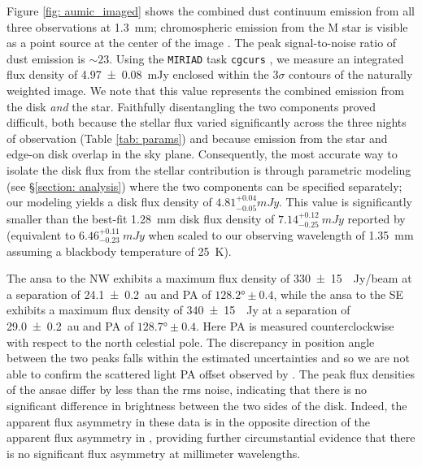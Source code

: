 \documentclass[modern]{aastex62}
\begin{document}
Figure \ref{fig: aumic_imaged} shows the combined dust continuum emission from all three observations at \SI{1.3}{mm}; chromospheric emission from the M star is visible as a point source at the center of the image \citep{cranmer13}. 
The peak signal-to-noise ratio of dust emission is $\sim 23$.
Using the \texttt{MIRIAD} task \texttt{cgcurs} \citep{sault95}, we measure an integrated flux density of \SI{4.97 \pm 0.08}{\milli Jy} enclosed within the $3\sigma$ contours of the naturally weighted image.  
We note that this value represents the combined emission from the disk \textit{and} the star. 
Faithfully disentangling the two components proved difficult, both because the stellar flux varied significantly across the three nights of observation (Table \ref{tab: params}) and because emission from the star and edge-on disk overlap in the sky plane.
Consequently, the most accurate way to isolate the disk flux from the stellar contribution is through parametric modeling (see \S \ref{section: analysis}) where the two components can be specified separately; our modeling yields a disk flux density of $4.81 ^{+0.04} _{-0.05} \si{mJy}$.
This value is significantly smaller than the best-fit \SI{1.28}{mm} disk flux density of $7.14^{+0.12}_{-0.25}~\si{mJy}$ reported by \cite{macgregor13} (equivalent to $6.46^{+0.11}_{-0.23}~\si{mJy}$ when scaled to our observing wavelength of \SI{1.35}{mm} assuming a blackbody temperature of \SI{25}{K}).

The ansa to the NW exhibits a maximum flux density of \SI{330 \pm 15}{\mu Jy/beam} at a separation of \SI{24.1 \pm 0.2}{au} and PA of $\ang[angle-symbol-over-decimal]{128.2} \pm 0.4$, while the ansa to the SE exhibits a maximum flux density of \SI{340 \pm 15}{\mu Jy} at a separation of \SI{29.0 \pm 0.2}{au} and PA of $\ang[angle-symbol-over-decimal]{128.7} \pm 0.4$. 
Here PA is measured counterclockwise with respect to the north celestial pole.
The discrepancy in position angle between the two peaks falls within the estimated uncertainties and so we are not able to confirm the scattered light PA offset observed by \cite{boccaletti15}. 
The peak flux densities of the ansae differ by less than the rms noise, indicating that there is no significant difference in brightness between the two sides of the disk.
Indeed, the apparent flux asymmetry in these data is in the opposite direction of the apparent flux asymmetry in \cite{macgregor13}, providing further circumstantial evidence that there is no significant flux asymmetry at millimeter wavelengths. 
\end{document}

